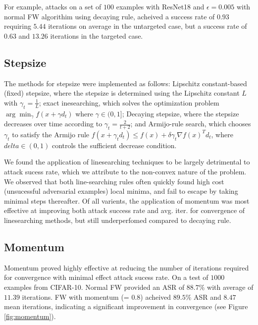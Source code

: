 \documentclass{article}
\begin{document}
For example, attacks on a set of $100$ examples with ResNet18 and $\epsilon = 0.005$ with normal FW algorithim using decaying rule, acheived a success rate of $0.93$ requiring $5.44$ iterations on average in the untargeted case, but a success rate of $0.63$ and $13.26$ iterations in the targeted case.

\subsection{Stepsize}
The methods for stepsize were implemented as follows: Lipschitz constant-based (fixed) stepsize, where the stepsize is determined using the Lipschitz constant \(L\) with \(\gamma_t = \frac{1}{L}\); exact inesearching, which solves the optimization problem \(\arg \min_{\gamma} f(x + \gamma d_t)\) where \(\gamma \in (0,1]\); Decaying stepsize, where the stepsize decreases over time according to \(\gamma_t = \frac{2}{t + 2}\); and Armijo-rule search, which chooses \(\gamma_t\) to satisfy the Armijo rule \(f(x + \gamma_t d_t) \leq f(x) + \delta \gamma_t \nabla f(x)^T d_t\), where \(delta \in (0,1)\) controls the sufficient decrease condition.

We found the application of linesearching techniques to be largely detrimental to attack sucess rate, which we attribute to the non-convex nature of the problem. We observed that both line-searching rules often quickly found high cost (unsucessful adversarial examples) local minima, and fail to escape by taking minimal steps thereafter. Of all varients, the application of momentum was most effective at improving both attack success rate and avg. iter. for convergence of linesearching methods, but still underperfomed compared to decaying rule.

\subsection{Momentum}

Momentum proved highly effective at reducing the number of iterations required for convergence with minimal effect attack sucess rate. On a test of $1000$ examples from CIFAR-10. Normal FW provided an ASR of $88.7\%$ with average of $11.39$ iterations. FW with momentum (\beta = 0.8) acheived $89.5\%$ ASR and $8.47$ mean iterations, indicating a significant improvement in convergence (see Figure \ref{fig:momentum}).
\end{document}
